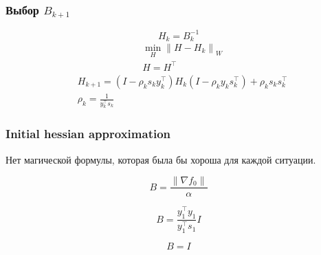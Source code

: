 \begin{frame}
  \frametitle{Выбор $B_{k+1}$}
      \begin{equation*}
        H_k = B_k^{-1} 
      \end{equation*}
      \begin{align*}
        &\min_H \left\| H - H_k \right\|_W \\
        &H = H^\intercal
      \end{align*}
      \begin{align*}
        &H_{k+1} = \left( I - \rho_k s_k y_k^\intercal \right) H_k \left( I - \rho_k y_k s_k^\intercal \right) + \rho_k s_k s_k^\intercal \\
        &\rho_k = \frac{1}{y_k^\intercal s_k}
      \end{align*}

\end{frame}

\begin{frame}
  \frametitle{Initial hessian approximation}

  Нет магической формулы, которая была бы хороша для каждой ситуации.

  \begin{equation*}
    B = \frac{\left\| \nabla f_0 \right\|}{\alpha}  
  \end{equation*}

  \begin{equation*}
    B = \frac{y_1^\intercal y_1}{y_1^\intercal s_1} I
  \end{equation*}

  \begin{equation*}
    B = I
  \end{equation*}
\end{frame}


